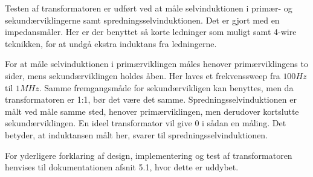 Testen af transformatoren er udført ved at måle selvinduktionen i primær- og sekundærviklingerne samt spredningsselvinduktionen. Det er gjort med en impedansmåler. Her er der benyttet så korte ledninger som muligt samt 4-wire teknikken, for at undgå ekstra induktans fra ledningerne. 

For at måle selvinduktionen i primærviklingen måles henover primærviklingens to sider, mens sekundærviklingen holdes åben. Her laves et frekvenssweep fra $100Hz$ til $1MHz$. Samme fremgangsmåde for sekundærvikligen kan benyttes, men da transformatoren er 1:1, bør det være det samme.
Spredningsselvinduktionen er målt ved måle samme sted, henover primærviklingen, men derudover kortslutte sekundærviklingen. En ideel transformator vil give 0 i sådan en måling. Det betyder, at induktansen målt her, svarer til spredningsselvinduktionen. 

For yderligere forklaring af design, implementering og test af transformatoren henvises til dokumentationen afsnit 5.1, hvor dette er uddybet.